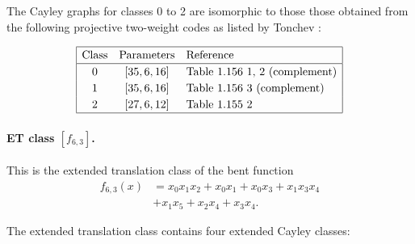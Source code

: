 \documentclass[12pt,a4paper]{article}
\begin{document}
The Cayley graphs for classes 0 to 2 are isomorphic to those those obtained from the following
projective two-weight
codes as listed by Tonchev \cite{Ton07codes}:

\begin{align*}
\def\arraystretch{1.2}
\begin{array}{|ccl|}
\hline
\text{Class} &
\text{Parameters} & \text{Reference}
\\
\hline
0 & [35,6,16] & \text{Table 1.156 1, 2 (complement)}
\\
1 & [35,6,16] & \text{Table 1.156 3 (complement)}
\\
2 & [27,6,12] & \text{Table 1.155 2 }
\\
\hline
\end{array}
\end{align*}

\paragraph*{ET class $[f_{6,3}]$.}

This is the extended translation class of the bent function
\begin{align*}
f_{6,3}(x) &= x_{0} x_{1} x_{2} + x_{0} x_{1} + x_{0} x_{3} + x_{1} x_{3} x_{4}
\\
           &+ x_{1} x_{5} + x_{2} x_{4} + x_{3} x_{4}.
\end{align*}

The extended translation class contains
four extended Cayley classes:
\end{document}
